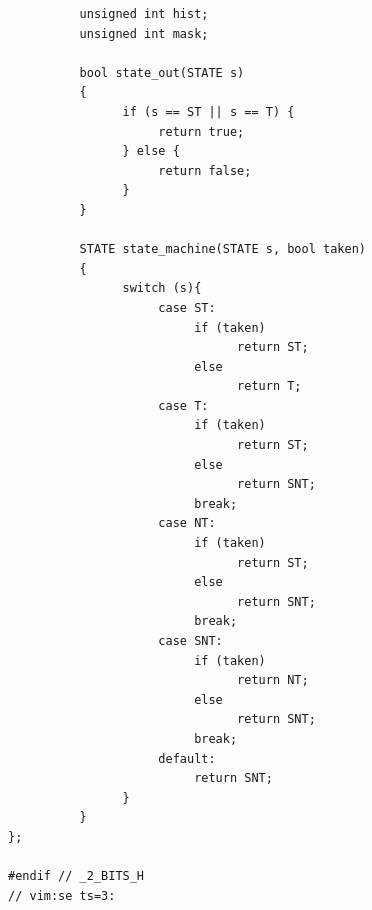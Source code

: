 \documentclass[a4paper]{article}
\begin{document}
\begin{verbatim}
		  unsigned int hist;
		  unsigned int mask;

		  bool state_out(STATE s)
		  {
				if (s == ST || s == T) {
					 return true;
				} else {
					 return false;
				}
		  }

		  STATE state_machine(STATE s, bool taken)
		  {
				switch (s){
					 case ST:
						  if (taken)
								return ST;
						  else
								return T;
					 case T:
						  if (taken)
								return ST;
						  else
								return SNT;
						  break;
					 case NT:
						  if (taken)
								return ST;
						  else
								return SNT;
						  break;
					 case SNT:
						  if (taken)
								return NT;
						  else
								return SNT;
						  break;
					 default:
						  return SNT;
				}
		  }
};

#endif // _2_BITS_H
// vim:se ts=3:
\end{verbatim}
\normalsize
\end{document}
